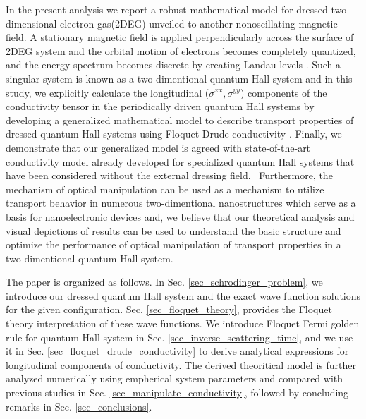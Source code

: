 In the present analysis we report a robust mathematical model for dressed two-dimensional electron gas(2DEG) unveiled to another nonoscillating magnetic field.
A stationary magnetic field is applied perpendicularly across the surface of 2DEG system and the orbital motion of electrons becomes completely quantized, and the energy spectrum becomes discrete by creating Landau levels \cite{landau30}.
Such a singular system is known as a two-dimentional quantum Hall system and in this study, we explicitly calculate the longitudinal  ($\sigma^{xx},\sigma^{yy}$) components of the conductivity tensor in the periodically driven quantum Hall systems by developing a generalized mathematical model to describe transport properties of dressed quantum Hall systems using Floquet-Drude conductivity \cite{wackerl20}.
Finally, we demonstrate that our generalized model is agreed with state-of-the-art conductivity model \cite{endo09} already developed for specialized quantum Hall systems that have been considered without the external dressing field. 
Furthermore, the mechanism of optical manipulation can be used as a mechanism to utilize transport behavior in numerous two-dimentional nanostructures which serve as a basis for nanoelectronic devices and, we believe that our theoretical analysis and visual depictions of results can be used to understand the basic structure and optimize the performance of optical manipulation of transport properties in a two-dimentional quantum Hall system.

The paper is organized as follows. In Sec.  \ref{sec_schrodinger_problem}, we introduce our dressed quantum Hall system and the exact wave function solutions for the given configuration. Sec. \ref{sec_floquet_theory}, provides the Floquet theory interpretation of these wave functions.
We introduce Floquet Fermi golden rule for quantum Hall system in Sec. \ref{sec_inverse_scattering_time}, and we use it in Sec. \ref{sec_floquet_drude_conductivity} to derive analytical expressions for longitudinal components of conductivity.
The derived theoritical model is further analyzed numerically using empherical system parameters and compared with previous studies in Sec. \ref{sec_manipulate_conductivity}, followed by concluding remarks in Sec. \ref{sec_conclusions}.
